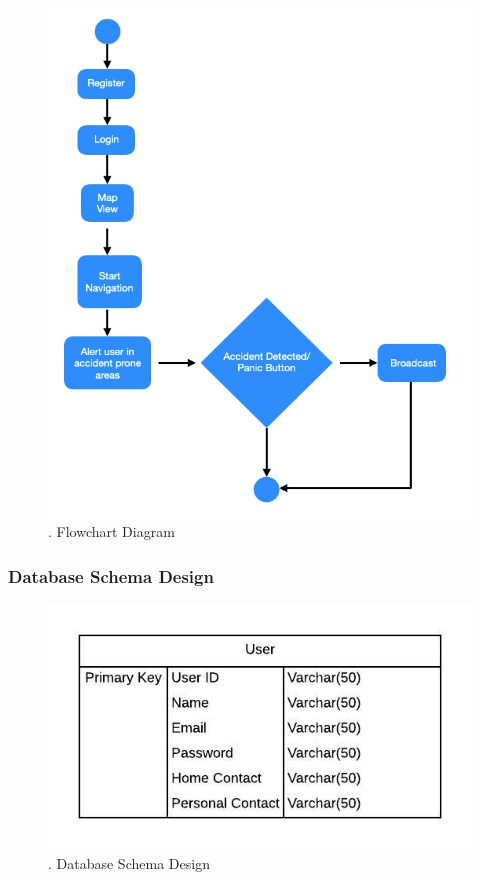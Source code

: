 \documentclass{article}
\begin{document}
\begin{flushleft}
\begin{figure}[!ht]
              \includegraphics[width=12cm]{FlowChart.jpg}
              \renewcommand{\thefigure}{ \thesubsection.\arabic{figure}}
              \caption{ .  Flowchart Diagram}
            \end{figure}
            \newpage
            \subsubsection{Database Schema Design}
             \begin{figure}[!ht]
              
              \includegraphics[width=12cm]{DSD.jpeg}
              \renewcommand{\thefigure}{ \thesubsection.\arabic{figure}}
              \caption{ .  Database Schema Design}
            \end{figure}
           

\end{flushleft}
\end{document}
